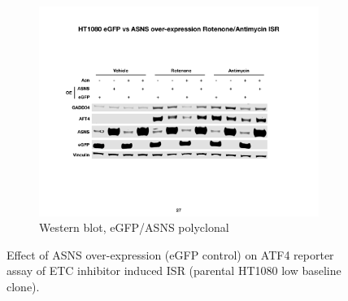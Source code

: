 \begin{figure}
\begin{subfigure}[b]{0.6\textwidth}
         \includegraphics[width=\textwidth]{figures/sapp/ISR/HT1080_ISR_ASNS_OE.pdf}
         \caption{Western blot, eGFP/ASNS polyclonal}
         \label{fig:sapp:ISR:HT1080_ISR_ASNS_OE}
     \end{subfigure}
     \hfill
        \caption[ASNS, rotenone/antimycin induced ISR]{
        Effect of ASNS over-expression (eGFP control) on ATF4 reporter assay of ETC inhibitor induced ISR (parental HT1080 low baseline clone).
        }
        \label{fig:sapp:ISR:ASNS_ISR}
\end{figure}





